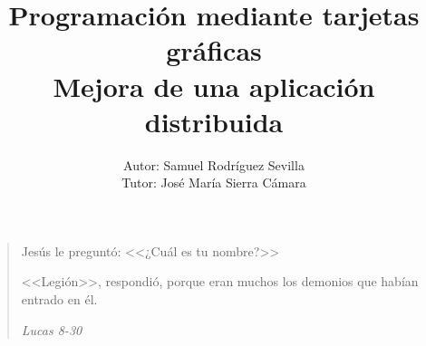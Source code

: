 \documentclass[12pt]{book}
\begin{document}
	
	\title{Programación mediante tarjetas gráficas\\Mejora de una aplicación distribuida}
	\author{Autor: Samuel Rodríguez Sevilla\\Tutor: José María Sierra Cámara}
	
	\maketitle
	
	\section*{}
	\pagebreak\newpage

	\vspace*{\fill}
	\begin{quote}
		Jesús le preguntó: <<¿Cuál es tu nombre?>>
		
		<<Legión>>, respondió, porque eran muchos los demonios que habían entrado en él.
		
		\emph{Lucas 8-30}
	\end{quote}
	\vspace*{\fill}
	
	\pagebreak\newpage
	\section*{}
	\pagebreak\newpage
	
	
	
	\tableofcontents
	\listoffigures
	\listoftables
	
	
	
	
	
	
	
	
	
	\appendix
	
	
	
	
	
	
	
	
	
	
	
\end{document}
